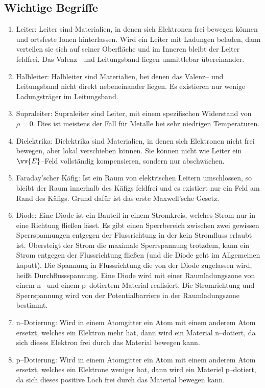 \documentclass[a4paper,12pt]{article}
\numberwithin{equation}{section}
\begin{document}
\subsection{Wichtige Begriffe}
\begin{enumerate}[label=$\circ$]
        \item Leiter: Leiter sind Materialien, in denen sich Elektronen frei bewegen können und ortsfeste Ionen hinterlassen. Wird ein Leiter mit Ladungen beladen, dann verteilen sie sich auf seiner Oberfläche und im Inneren bleibt der Leiter feldfrei. Das Valenz-- und Leitungsband liegen unmittlebar übereinander.
        \item Halbleiter: Halbleiter sind Materialien, bei denen das Valenz-- und Leitungsband nicht direkt nebeneinander liegen. Es existieren nur wenige Ladungsträger im Leitungsband.
        \item Supraleiter: Supraleiter sind Leiter, mit einem spezifischen Widerstand von $\rho =0$. Dies ist meistens der Fall für Metalle bei sehr niedrigen Temperaturen.
        \item Dielektrika: Dielektrika sind Materialien, in denen sich Elektronen nicht frei bewegen, aber lokal verschieben können. Sie können nicht wie Leiter ein $\vv{E}$--Feld vollständig kompensieren, sondern nur abschwächen.
        \item Faraday'scher Käfig: Ist ein Raum von elektrischen Leitern umschlossen, so bleibt der Raum innerhalb des Käfigs feldfrei und es existiert nur ein Feld am Rand des Käfigs. Grund dafür ist das erste Maxwell'sche Gesetz.
        \item Diode: Eine Diode ist ein Bauteil in einem Stromkreis, welches Strom nur in eine Richtung fließen lässt. Es gibt einen Sperrbereich zwischen zwei gewissen Sperrspannungen entgegen der Flussrichtung in der kein Stromfluss erlaubt ist. Übersteigt der Strom die maximale Sperrspannung trotzdem, kann ein Strom entgegen der Flussrichtung fließen (und die Diode geht im Allgemeinen kaputt). Die Spannung in Flussrichtung die von der Diode zugelassen wird, heißt Durchflussspannung. Eine Diode wird mit einer Raumladungszone von einem n-- und einem p--dotiertem Material realisiert. Die Stromrichtung und Sperrspannung wird von der Potentialbarriere in der Raumladungszone bestimmt.
        \item n--Dotierung: Wird in einem Atomgitter ein Atom mit einem anderem Atom ersetzt, welches ein Elektron mehr hat, dann wird ein Material n--dotiert, da sich dieses Elektron frei durch das Material bewegen kann.
        \item p--Dotierung: Wird in einem Atomgitter ein Atom mit einem anderem Atom ersetzt, welches ein Elektrone weniger hat, dann wird ein Materiel p--dotiert, da sich dieses positive Loch frei durch das Material bewegen kann.

\end{enumerate}
\end{document}
